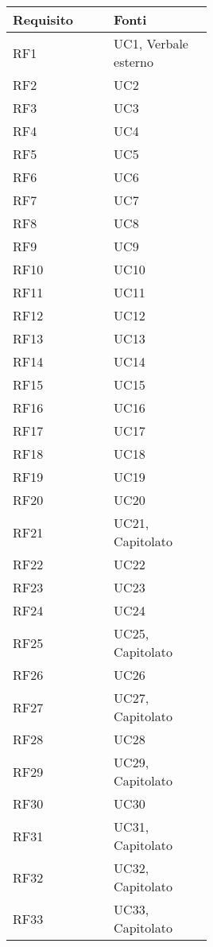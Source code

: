\iffalse
\begin{center}
	\begin{tabular}{ |p{0.25\linewidth}|p{0.25\linewidth}| } 
		\hline
		\textbf{Requisito} & \textbf{Fonti} \\
		\hline
		RF1 & UC1, Verbale esterno \\
		\hline
		RF2 & UC2 \\
		\hline
		RF3 & UC3 \\
		\hline
		RF4 & UC4 \\
		\hline
		RF5 & UC5 \\
		\hline
		RF6 & UC6 \\
		\hline
		RF7 & UC7 \\
		\hline
		RF8 & UC8 \\
		\hline
		RF9 & UC9 \\
		\hline
		RF10 & UC10 \\
		\hline
		RF11 & UC11 \\
		\hline
		RF12 & UC12 \\
		\hline
		RF13 & UC13 \\
		\hline
		RF14 & UC14 \\
		\hline
		RF15 & UC15 \\
		\hline
		RF16 & UC16 \\
		\hline
		RF17 & UC17 \\
		\hline
		RF18 & UC18 \\
		\hline
		RF19 & UC19 \\
		\hline
		RF20 & UC20 \\
		\hline
		RF21 & UC21, Capitolato \\
		\hline
		RF22 & UC22 \\
		\hline
		RF23 & UC23 \\
		\hline
		RF24 & UC24 \\
		\hline
		RF25 & UC25, Capitolato \\
		\hline
		RF26 & UC26 \\
		\hline
		RF27 & UC27, Capitolato \\
		\hline
		RF28 & UC28 \\
		\hline
		RF29 & UC29, Capitolato \\
		\hline
		RF30 & UC30 \\
		\hline
		RF31 & UC31, Capitolato \\
		\hline
		RF32 & UC32, Capitolato \\
		\hline
		RF33 & UC33, Capitolato \\

\end{tabular}
\end{center}
